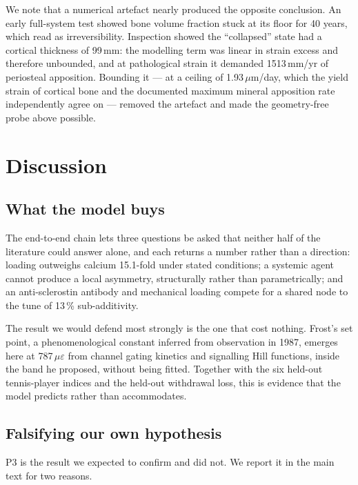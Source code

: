 \documentclass[10pt,letterpaper]{article}
\newcommand{\ue}{\ensuremath{\mu\varepsilon}}
\begin{document}
We note that a numerical artefact nearly produced the opposite conclusion. An
early full-system test showed bone volume fraction stuck at its floor for 40
years, which read as irreversibility. Inspection showed the ``collapsed''
state had a cortical thickness of 99\,mm: the modelling term was linear in
strain excess and therefore unbounded, and at pathological strain it demanded
1513\,mm/yr of periosteal apposition. Bounding it --- at a ceiling of
1.93\,$\mu$m/day, which the yield strain of cortical bone
\cite{bayraktar2004,morgan2001} and the documented maximum mineral apposition
rate independently agree on --- removed the artefact and made the
geometry-free probe above possible.

\section*{Discussion}

\subsection*{What the model buys}

The end-to-end chain lets three questions be asked that neither half of the
literature could answer alone, and each returns a number rather than a
direction: loading outweighs calcium 15.1-fold under stated conditions; a
systemic agent cannot produce a local asymmetry, structurally rather than
parametrically; and an anti-sclerostin antibody and mechanical loading compete
for a shared node to the tune of 13\,\% sub-additivity.

The result we would defend most strongly is the one that cost nothing. Frost's
set point, a phenomenological constant inferred from observation in 1987,
emerges here at 787\,\ue{} from channel gating kinetics and signalling Hill
functions, inside the band he proposed, without being fitted. Together with
the six held-out tennis-player indices and the held-out withdrawal loss, this
is evidence that the model predicts rather than accommodates.

\subsection*{Falsifying our own hypothesis}

P3 is the result we expected to confirm and did not. We report it in the main
text for two reasons.
\end{document}
